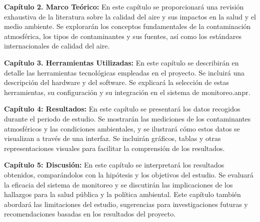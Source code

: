 	\item  \textbf{Capítulo 2. Marco Teórico: }En este capítulo se proporcionará una revisión exhaustiva de la literatura sobre la calidad del aire y sus impactos en la salud y el medio ambiente. Se explorarán los conceptos fundamentales de la contaminación atmosférica, los tipos de contaminantes y sus fuentes, así como los estándares internacionales de calidad del aire.
 
	\item  \textbf{Capítulo 3. Herramientas Utilizadas: }En este capítulo se describirán en detalle las herramientas tecnológicas empleadas en el proyecto. Se incluirá una descripción del hardware y del software. Se explicará la selección de estas herramientas, su configuración y su integración en el sistema de monitoreo.\gls{anpr}.
 
	\item  \textbf{Capítulo 4: Resultados: }En este capítulo se presentará los datos recogidos durante el periodo de estudio. Se mostrarán las mediciones de los contaminantes atmosféricos y las condiciones ambientales, y se ilustrará cómo estos datos se visualizan a través de una interfaz. Se incluirán gráficos, tablas y otras representaciones visuales para facilitar la comprensión de los resultados.
 
	\item  \textbf{Capítulo 5: Discusión: }En este capítulo se interpretará los resultados obtenidos, comparándolos con la hipótesis y los objetivos del estudio. Se evaluará la eficacia del sistema de monitoreo y se discutirán las implicaciones de los hallazgos para la salud pública y la política ambiental. Este capítulo también abordará las limitaciones del estudio, sugerencias para investigaciones futuras y recomendaciones basadas en los resultados del proyecto.
 

